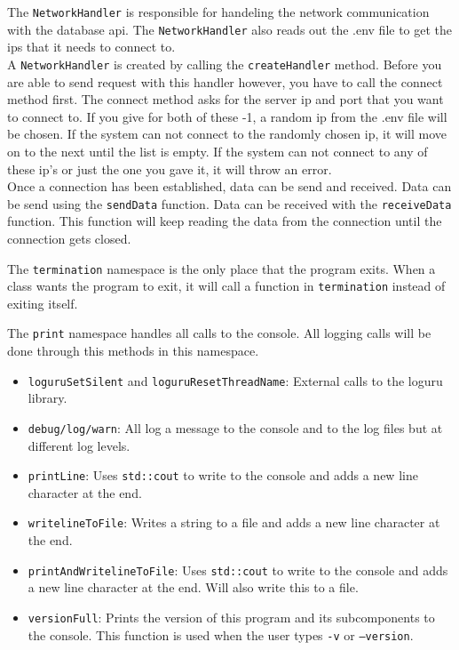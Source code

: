 \documentclass[../Main.tex]{subfiles}
\begin{document}
The \texttt{NetworkHandler} is responsible for handeling the network communication with the database api. The \texttt{NetworkHandler} also reads out the .env file to get the ips that it needs to connect to.\\
A \texttt{NetworkHandler} is created by calling the \texttt{createHandler} method. Before you are able to send request with this handler however, you have to call the connect method first. The connect method asks for the server ip and port that you want to connect to. If you give for both of these -1, a random ip from the .env file will be chosen. If the system can not connect to the randomly chosen ip, it will move on to the next until the list is empty. If the system can not connect to any of these ip's or just the one you gave it, it will throw an error.\\
Once a connection has been established, data can be send and received. Data can be send using the \texttt{sendData} function. Data can be received with the \texttt{receiveData} function. This function will keep reading the data from the connection until the connection gets closed.


The \texttt{termination} namespace is the only place that the program exits. When a class wants the program to exit, it will call a function in \texttt{termination} instead of exiting itself.

The \texttt{print} namespace handles all calls to the console. All logging calls will be done through this methods in this namespace.
\begin{itemize}
    \item \texttt{loguruSetSilent} and \texttt{loguruResetThreadName}: External calls to the loguru library.
    \item \texttt{debug/log/warn}: All log a message to the console and to the log files but at different log levels.
    \item \texttt{printLine}: Uses \texttt{std::cout} to write to the console and adds a new line character at the end. 
    \item \texttt{writelineToFile}: Writes a string to a file and adds a new line character at the end. 
    \item \texttt{printAndWritelineToFile}: Uses \texttt{std::cout} to write to the console and adds a new line character at the end. Will also write this to a file.
    \item \texttt{versionFull}: Prints the version of this program and its subcomponents to the console. This function is used when the user types \texttt{-v} or \texttt{--version}.
\end{itemize}
\end{document}
